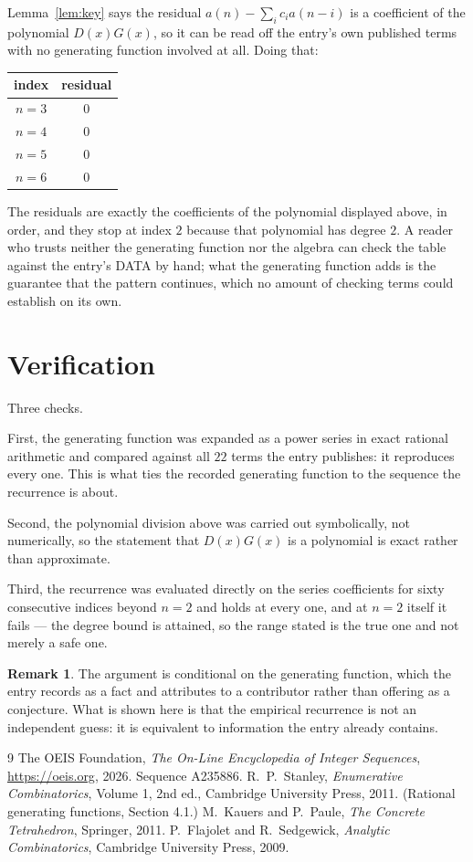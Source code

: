 \documentclass[11pt,a4paper]{article}
\theoremstyle{plain}
\theoremstyle{definition}
\newtheorem{remark}[theorem]{Remark}
\begin{document}
Lemma~\ref{lem:key} says the residual $a(n)-\sum_ic_ia(n-i)$ is a coefficient of the
polynomial $D(x)G(x)$, so it can be read off the entry's own published terms with no
generating function involved at all. Doing that:
\begin{center}
\begin{tabular}{cc}
index & residual \\ \hline
$n=3$ & $0$ \\
$n=4$ & $0$ \\
$n=5$ & $0$ \\
$n=6$ & $0$
\end{tabular}
\end{center}
The residuals are exactly the coefficients of the polynomial displayed above, in order, and
they stop at index $2$ because that polynomial has degree $2$. A reader who trusts
neither the generating function nor the algebra can check the table against the entry's DATA
by hand; what the generating function adds is the guarantee that the pattern continues, which
no amount of checking terms could establish on its own.

\section{Verification}

Three checks.

First, the generating function was expanded as a power series in exact rational arithmetic and
compared against all $22$ terms the entry publishes: it reproduces every one. This is
what ties the recorded generating function to the sequence the recurrence is about.

Second, the polynomial division above was carried out symbolically, not numerically, so the
statement that $D(x)G(x)$ is a polynomial is exact rather than approximate.

Third, the recurrence was evaluated directly on the series coefficients for sixty consecutive
indices beyond $n=2$ and holds at every one, and at $n=2$ itself it fails --- the
degree bound is attained, so the range stated is the true one and not merely a safe one.

\begin{remark}
The argument is conditional on the generating function, which the entry records as a fact and
attributes to a contributor rather than offering as a conjecture. What is shown here is that
the empirical recurrence is not an independent guess: it is equivalent to information the
entry already contains.
\end{remark}

\begin{thebibliography}{9}
 The OEIS Foundation, \emph{The On-Line Encyclopedia of Integer
Sequences}, \url{https://oeis.org}, 2026. Sequence A235886.
 R.~P.~Stanley, \emph{Enumerative Combinatorics}, Volume 1, 2nd ed.,
Cambridge University Press, 2011. (Rational generating functions, Section 4.1.)
 M.~Kauers and P.~Paule, \emph{The Concrete Tetrahedron}, Springer, 2011.
 P.~Flajolet and R.~Sedgewick, \emph{Analytic Combinatorics}, Cambridge
University Press, 2009.
\end{thebibliography}
\end{document}
